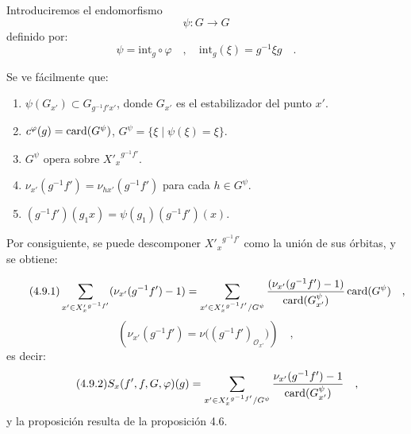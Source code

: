 \medskip

\begin{prooftext}[Demostración]
Introduciremos el endomorfismo
\[
\psi : G \longrightarrow G
\]
definido por:
\[
\psi = \mathrm{int}_g \circ \varphi \quad , \quad \mathrm{int}_g(\xi) = g^{-1}\xi g \quad .
\]

Se ve fácilmente que:
\begin{enumerate}
\item[i)] $\psi(G_{x'}) \subset G_{g^{-1}f'x'}$, donde $G_{x'}$ es el estabilizador del punto $x'$.
\item[ii)] $c^\varphi(g) = \operatorname{card}(G^\psi)$, $G^\psi = \{ \xi \mid \psi(\xi) = \xi \}$.
\item[iii)] $G^\psi$ opera sobre ${X'_x}^{g^{-1}f'}$.
\item[iv)] $\nu_{x'}(g^{-1}f') = \nu_{hx'}(g^{-1}f')$ para cada $h \in G^\psi$.
\item[v)] $(g^{-1}f')(g_1x) = \psi(g_1)(g^{-1}f')(x)$.
\end{enumerate}

Por consiguiente, se puede descomponer ${X'_x}^{g^{-1}f'}$ como la unión de sus órbitas, y se obtiene:

\begin{equation}\tag{4.9.1}
\sum_{x' \in {X'_x}^{g^{-1}f'}} (\nu_{x'}(g^{-1}f') - 1) = \sum_{x' \in {X'_x}^{g^{-1}f'}/G^\psi} \frac{(\nu_{x'}(g^{-1}f') - 1)}{\operatorname{card}(G^\psi_{x'})} \operatorname{card}(G^\psi) \quad ,
\end{equation}
\[
(\nu_{x'}(g^{-1}f')=\nu\bigl((g^{-1}f')_{\mathcal{O}_{x'}}\bigr)) \quad ,
\]
es decir:
\begin{equation}\tag{4.9.2}
S_x(f',f,G,\varphi)(g)=\sum_{x' \in {X'_x}^{g^{-1}f'}/G^\psi}
\frac{\nu_{x'}(g^{-1}f')-1}{\operatorname{card}(G^\psi_{x'})} \quad ,
\end{equation}
y la proposición resulta de la proposición 4.6.
\end{prooftext}
